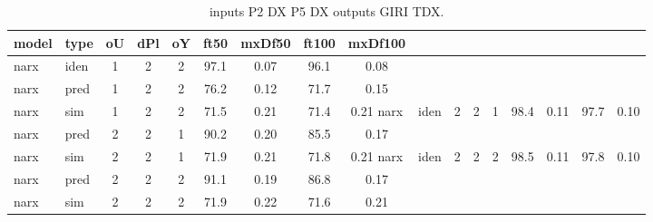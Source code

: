 \begin{center} 
\begin{longtable}{ll|ccc|cc|cc} 
\caption[inputs P2 DX P5 DX   outputs GIRI TDX]{inputs P2 DX P5 DX   outputs GIRI TDX.} 
\label{tab:inputs_P2_DX_P5_DX___outputs_GIRI_TDX} 
\hline 
  model & type & oU & dPl & oY & ft50 & mxDf50 & ft100 & mxDf100 \\ 
 \hline 
narx & iden & 1 & 2 & 2 & 97.1 & 0.07 & 96.1 & 0.08 \\ 
narx & pred & 1 & 2 & 2 & 76.2 & 0.12 & 71.7 & 0.15 \\ 
narx & sim  & 1 & 2 & 2 & 71.5 & 0.21 & 71.4 & 0.21 
 \hline 
narx & iden & 2 & 2 & 1 & 98.4 & 0.11 & 97.7 & 0.10 \\ 
narx & pred & 2 & 2 & 1 & 90.2 & 0.20 & 85.5 & 0.17 \\ 
narx & sim  & 2 & 2 & 1 & 71.9 & 0.21 & 71.8 & 0.21 
 \hline 
narx & iden & 2 & 2 & 2 & 98.5 & 0.11 & 97.8 & 0.10 \\ 
narx & pred & 2 & 2 & 2 & 91.1 & 0.19 & 86.8 & 0.17 \\ 
narx & sim  & 2 & 2 & 2 & 71.9 & 0.22 & 71.6 & 0.21 
 \hline 
\end{longtable} 
\end{center}